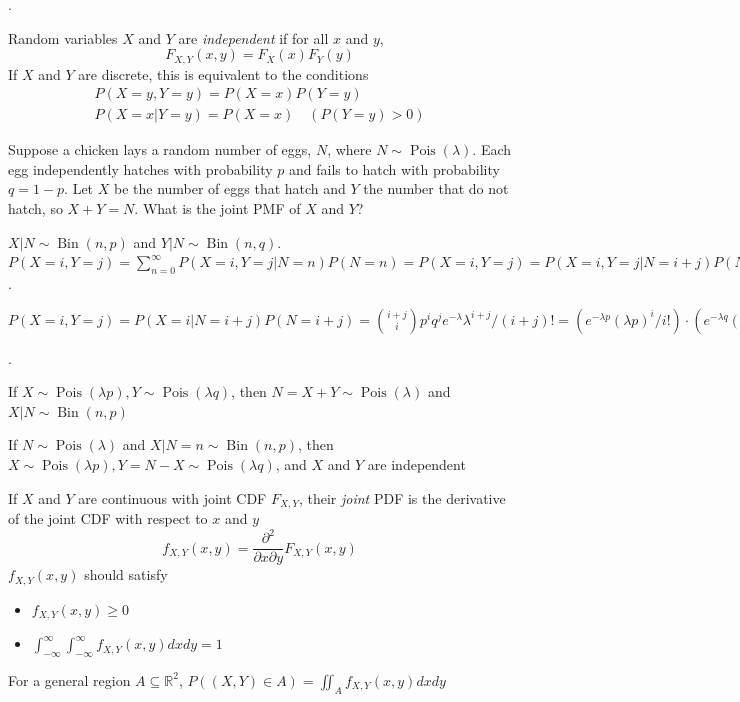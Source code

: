 \documentclass[8pt]{beamer}
\newcommand{\mbb}[1]{\mathbb{#1}}
\newcommand{\ti}[1]{\textit{#1}}
\newcommand{\Pois}[1]{\operatorname{Pois}(#1)}
\newcommand{\Bin}[2]{\operatorname{Bin}\!\left(#1,#2\right)}
\begin{document}
\begin{frame}{.}
    \begin{definition}[Independence of r.v.s]
        Random variables $X$ and $Y$ are \ti{independent} if for all $x$ and $y$,
        \[
            F_{X,Y} (x,y) = F_X(x) F_Y(y)
        \]
        If $X$ and $Y$ are discrete, this is equivalent to the conditions
        \[
        \begin{gathered}
            P(X=y,Y=y) = P(X=x)P(Y=y)\\
            P(X=x|Y=y) = P(X=x) \quad (P(Y=y) > 0)
        \end{gathered}
        \]
    \end{definition}
    \begin{example}
        Suppose a chicken lays a random number of eggs, $N$, where $N\sim \Pois{\lambda}$. Each egg independently hatches with probability $p$ and fails to hatch with probability $q= 1 - p$. Let $X$ be the number of eggs that hatch and $Y$ the number that do not hatch, so $X+Y = N$. What is the joint PMF of $X$ and $Y$?
    \end{example}

    $X|N \sim \Bin{n}{p}$ and $Y|N \sim \Bin{n}{q}$. $P(X=i,Y=j) = \sum_{n=0}^\infty P(X=i,Y=j|N=n)P(N=n) = P(X=i,Y=j) = P(X=i,Y=j|N=i+j)P(N=i+j) = P(X=i|N=i+j)P(N=i+j)$.

    $P(X=i,Y=j) = P(X=i|N=i+j)P(N=i+j) = \binom{i+j}{i} p^i q^j e^{-\lambda} \lambda^{i+j} / (i+j)! = (e^{-\lambda p} (\lambda p)^i / i!)\cdot (e^{-\lambda q} (\lambda q)^{j} / j!) \implies X \sim \Pois{\lambda p}, Y \sim \Pois{\lambda q}$
\end{frame}

\begin{frame}{.}
    \begin{theorem}
        If $X\sim \Pois{\lambda p}, Y\sim \Pois{\lambda q}$, then $N=X+Y \sim \Pois{\lambda}$ and $X|N \sim \Bin{n}{p}$
    \end{theorem}
    \begin{theorem}
        If $N \sim \Pois{\lambda}$ and $X|N = n \sim \Bin{n}{p}$, then $X\sim \Pois{\lambda p }, Y = N-X \sim \Pois{\lambda q}$, and $X$ and $Y$ are independent
    \end{theorem}
    \begin{definition}
        If $X$ and $Y$ are continuous with joint CDF $F_{X,Y}$, their \ti{joint} PDF is the derivative of the joint CDF with respect to $x$ and $y$
        \[
            f_{X,Y}(x,y) = \frac{\partial^2}{\partial x \partial y} F_{X,Y}(x,y)
        \]
        $f_{X,Y} (x,y)$ should satisfy
        \begin{itemize}
            \item $f_{X,Y} (x,y) \geq 0$
            \item $\int_{-\infty}^\infty \int_{-\infty}^\infty f_{X,Y}(x,y) dx dy =1$
        \end{itemize}
    \end{definition}
    For a general region $A \subseteq \mbb{R}^2$, $P((X,Y)\in A) = \iint_{A} f_{X,Y} (x,y) dx dy$
\end{frame}
\end{document}
